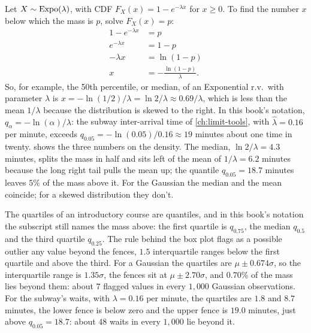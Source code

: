 \begin{example}
\label{ex:expo-quantile}
Let $X \sim \text{Expo}(\lambda)$, with CDF $F_X(x) = 1 - e^{-\lambda x}$ for $x \geq 0$.
To find the number $x$ below which the mass is $p$, solve $F_X(x) = p$:
\begin{align*}
1 - e^{-\lambda x} &= p \\
e^{-\lambda x} &= 1 - p \\
-\lambda x &= \ln(1 - p) \\
x &= -\frac{\ln(1-p)}{\lambda}.
\end{align*}
So, for example, the 50th percentile, or median, of an Exponential r.v.\ with parameter $\lambda$ is $x = -\ln(1/2)/\lambda = \ln 2 / \lambda \approx 0.69/\lambda$, which is less than the mean $1/\lambda$ because the distribution is skewed to the right.
In this book's notation, $q_\alpha = -\ln(\alpha)/\lambda$: the subway inter-arrival time of \cref{ch:limit-tools}, with $\hat{\lambda} = 0.16$ per minute, exceeds $q_{0.05} = -\ln(0.05)/0.16 \approx 19$ minutes about one time in twenty.
 shows the three numbers on the density.
The median, $\ln 2/\lambda = 4.3$ minutes, splits the mass in half and sits left of the mean of $1/\lambda = 6.2$ minutes because the long right tail pulls the mean up; the quantile $q_{0.05} = 18.7$ minutes leaves $5\%$ of the mass above it.
For the Gaussian the median and the mean coincide; for a skewed distribution they don't.
\end{example}

\begin{bridge}
The quartiles of an introductory course are quantiles, and in this book's notation the subscript still names the mass above: the first quartile is $q_{0.75}$, the median $q_{0.5}$ and the third quartile $q_{0.25}$.
The rule behind the box plot flags as a possible outlier any value beyond the fences, $1.5$ interquartile ranges below the first quartile and above the third.
For a Gaussian the quartiles are $\mu \pm 0.674\sigma$, so the interquartile range is $1.35\sigma$, the fences sit at $\mu \pm 2.70\sigma$, and $0.70\%$ of the mass lies beyond them: about $7$ flagged values in every $1{,}000$ Gaussian observations.
For the subway's waits, with $\lambda = 0.16$ per minute, the quartiles are $1.8$ and $8.7$ minutes, the lower fence is below zero and the upper fence is $19.0$ minutes, just above $q_{0.05} = 18.7$: about $48$ waits in every $1{,}000$ lie beyond it.
\end{bridge}

